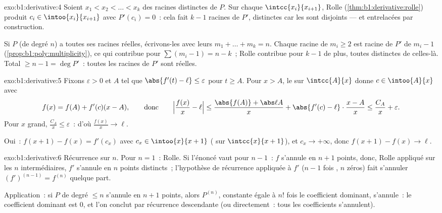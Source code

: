 \begin{solution}{exo:b1:derivative:4}
Soient $x_1 < x_2 < \dots < x_k$ des racines distinctes de $P$. Sur chaque
$\intcc{x_i}{x_{i+1}}$, Rolle (\cref{thm:b1:derivative:rolle})
produit $c_i \in \intoo{x_i}{x_{i+1}}$ avec $P'(c_i) = 0$~: cela fait
$k - 1$ racines de $P'$, distinctes car les   sont
disjoints --- et entrelacées par construction.

Si $P$ (de degré $n$) a toutes ses racines réelles, écrivons-les avec
leurs  $m_1 + \dots + m_k = n$. Chaque racine de 
$m_i \geq 2$ est racine de $P'$ de  $m_i - 1$
(\cref{prop:b1:poly:multiplicity}), ce qui contribue pour $\sum (m_i - 1) = n
- k$~; Rolle contribue pour $k - 1$ de plus, toutes distinctes de celles-là. Total
$\geq n - 1 = \deg P'$~: toutes les racines de $P'$ sont réelles.
\end{solution}

\begin{solution}{exo:b1:derivative:5}
Fixons $\varepsilon > 0$ et $A$ tel que $\abs{f'(t) - \ell} \leq
\varepsilon$ pour $t \geq A$. Pour $x > A$, le  sur
$\intcc{A}{x}$ donne $c \in \intoo{A}{x}$ avec
\[
f(x) = f(A) + f'(c)(x - A),
\qquad\text{donc}\qquad
\Bigl|\frac{f(x)}{x} - \ell\Bigr|
\leq \frac{\abs{f(A)} + \abs\ell A}{x} + \abs{f'(c) - \ell}
\cdot\frac{x - A}{x} \leq \frac{C_A}{x} + \varepsilon .
\]
Pour $x$ grand, $\frac{C_A}{x} \leq \varepsilon$~: d'où
$\frac{f(x)}{x} \to \ell$.

Oui~: $f(x+1) - f(x) = f'(c_x)$ avec $c_x \in \intoo{x}{x+1}$ ( sur $\intcc{x}{x+1}$), et $c_x \to +\infty$, donc
$f(x+1) - f(x) \to \ell$.
\end{solution}

\begin{solution}{exo:b1:derivative:6}
Récurrence sur $n$. Pour $n = 1$~: Rolle. Si l'énoncé vaut pour $n - 1$~:
$f$ s'annule en $n+1$ points, donc, Rolle appliqué sur les $n$ 
intermédiaires, $f'$ s'annule en $n$ points distincts~; l'hypothèse de récurrence
appliquée à $f'$ ($n-1$ fois , $n$ zéros) fait
s'annuler $(f')^{(n-1)} = f^{(n)}$ quelque part.

Application~: si $P$ de degré $\leq n$ s'annule en $n+1$ points, alors
$P^{(n)}$, constante égale à $n!$ fois le coefficient dominant,
s'annule~: le coefficient dominant est $0$, et l'on conclut par
récurrence descendante (ou directement~: tous les coefficients s'annulent).
\end{solution}


